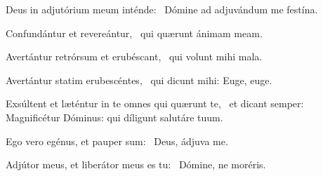 \item Deus in adjutórium meum inténde:~\psstar{} Dómine ad adjuvándum me festína.

\item Confundántur et revereántur,~\psstar{} qui quærunt ánimam meam.

\item Avertántur retrórsum et erubéscant,~\psstar{} qui volunt mihi mala.

\item Avertántur statim erubescéntes,~\psstar{} qui dicunt mihi: Euge, euge.

\item Exsúltent et læténtur in te omnes qui quærunt te,~\psstar{} et dicant semper: Magnificétur Dóminus: qui díligunt salutáre tuum.

\item Ego vero egénus, et pauper sum:~\psstar{} Deus, ádjuva me.

\item Adjútor meus, et liberátor meus es tu:~\psstar{} Dómine, ne moréris.